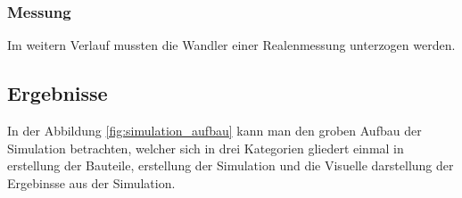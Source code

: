 






\subsubsection{Messung}
\label{sec:vorgehen:messung}

Im weitern Verlauf mussten die Wandler einer Realenmessung unterzogen werden.


\subsection{Ergebnisse}
\label{sec:ergebnisse}

In der Abbildung \ref{fig:simulation_aufbau} kann man den groben Aufbau der Simulation betrachten, welcher sich in drei Kategorien gliedert einmal in erstellung der Bauteile, erstellung der Simulation und die Visuelle darstellung der Ergebinsse aus der Simulation.


